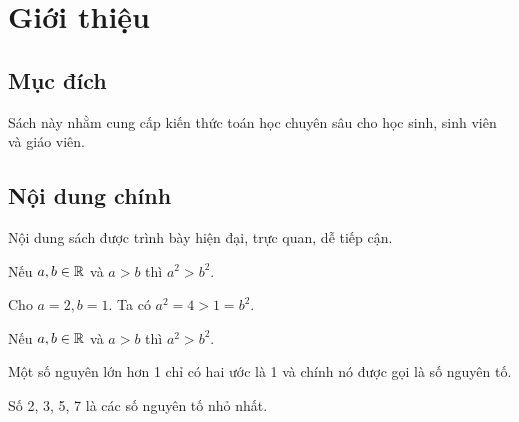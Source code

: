 \chapter{Giới thiệu}

\section{Mục đích}
Sách này nhằm cung cấp kiến thức toán học chuyên sâu cho học sinh, sinh viên và giáo viên.

\section{Nội dung chính}
Nội dung sách được trình bày hiện đại, trực quan, dễ tiếp cận.

\begin{dinhly}[Ví dụ định lý]
Nếu $a, b \in \mathbb{R}$ và $a > b$ thì $a^2 > b^2$.
\end{dinhly}

\begin{vidu}
Cho $a = 2, b = 1$. Ta có $a^2 = 4 > 1 = b^2$.
\end{vidu}

\begin{lythuyet}
Nếu $a, b \in \mathbb{R}$ và $a > b$ thì $a^2 > b^2$.
\end{lythuyet}

\begin{dinhnghiaBox}[Số nguyên tố]
Một số nguyên lớn hơn 1 chỉ có hai ước là 1 và chính nó được gọi là số nguyên tố.
\end{dinhnghiaBox}

\begin{viduBox}[Ví dụ về số nguyên tố]
Số 2, 3, 5, 7 là các số nguyên tố nhỏ nhất.
\end{viduBox}
